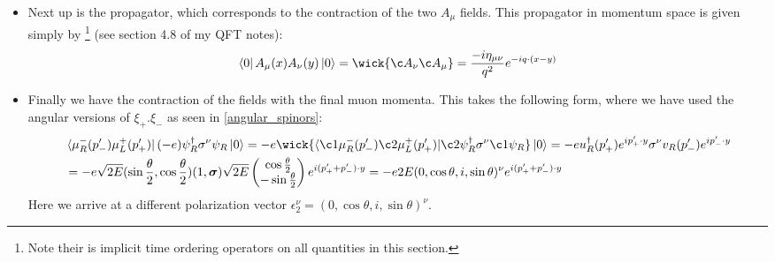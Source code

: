 \documentclass[11pt]{article}
\numberwithin{equation}{section}
\begin{document}
\begin{itemize}
    \item Next up is the propagator, which corresponds to the contraction of the two $A_{\mu}$ fields. This propagator in momentum space is given simply by \footnote{Note their is implicit time ordering operators on all quantities in this section. } (see section 4.8 of my QFT notes):
    \begin{align*}
       \bra{0} A_{\mu}(x) A_{\nu}(y)\ket{0}=\wick{\c A_{\nu}\c A_{\mu}} = \frac{-i\eta_{\mu\nu}}{q^2}e^{-iq \cdot (x - y)}
     \end{align*}
     \item Finally we have the contraction of the fields with the final muon momenta. This takes the following form, where we have used the angular versions of $\xi_+.\xi_-$ as seen in \ref{angular_spinors}:  
     \begin{align*}
         &\bra{\mu_R^{-}(p_-')\mu_L^{+}(p_+')}(- e)\psi^{\dagger}_R\sigma^{\nu}\psi_R \ket{0}=-e \wick{  \langle \c1\mu_R^{-}(p_-')\c2 \mu_L^{+}(p_+')| \c2 \psi^{\dagger}_R\sigma^{\nu}\c1 \psi_R}\ket{0} = -eu^{\dagger}_R(p_+')e^{ip_{+}'\cdot y}\sigma^{\nu}v_R(p_-')e^{ip_-'\cdot y} \\
         & = -e \sqrt{2E}(\sin \frac{\theta}{2} , \cos \frac{\theta}{2}) (1,\boldsymbol{\sigma})\sqrt{2E}\begin{pmatrix}
             \cos \frac{\theta}{2} \\ -\sin \frac{\theta}{2}
         \end{pmatrix} e^{i(p_+'+p_-')\cdot y} = -e2E( 0, \cos \theta, i, \sin \theta)^{\nu}e^{i(p_+'+p_-')\cdot y}
     \end{align*}
     Here we arrive at a different polarization vector $\epsilon_2^{\nu} = ( 0, \cos \theta, i, \sin \theta)^{\nu}$. 


\end{itemize}
\end{document}
